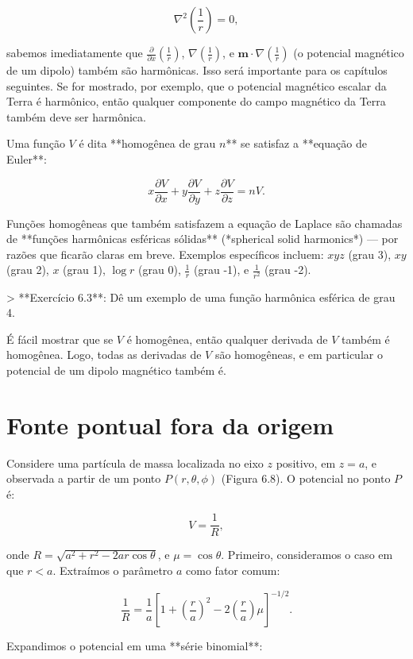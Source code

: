 $$
\nabla^2 \left( \frac{1}{r} \right) = 0,
$$

sabemos imediatamente que $\frac{\partial}{\partial x} \left( \frac{1}{r} \right)$, $\nabla \left( \frac{1}{r} \right)$, e $\mathbf{m} \cdot \nabla \left( \frac{1}{r} \right)$ (o potencial magnético de um dipolo) também são harmônicas. Isso será importante para os capítulos seguintes. Se for mostrado, por exemplo, que o potencial magnético escalar da Terra é harmônico, então qualquer componente do campo magnético da Terra também deve ser harmônica.

Uma função $V$ é dita **homogênea de grau $n$** se satisfaz a **equação de Euler**:

$$
x \frac{\partial V}{\partial x} + y \frac{\partial V}{\partial y} + z \frac{\partial V}{\partial z} = n V. \tag{6.19}
$$

Funções homogêneas que também satisfazem a equação de Laplace são chamadas de **funções harmônicas esféricas sólidas** (*spherical solid harmonics*) — por razões que ficarão claras em breve. Exemplos específicos incluem: $xyz$ (grau 3), $xy$ (grau 2), $x$ (grau 1), $\log r$ (grau 0), $\frac{1}{r}$ (grau -1), e $\frac{1}{r^2}$ (grau -2).

> **Exercício 6.3**: Dê um exemplo de uma função harmônica esférica de grau 4.

É fácil mostrar que se $V$ é homogênea, então qualquer derivada de $V$ também é homogênea. Logo, todas as derivadas de $V$ são homogêneas, e em particular o potencial de um dipolo magnético também é.





\section{Fonte pontual fora da origem}


Considere uma partícula de massa localizada no eixo $z$ positivo, em $z = a$, e observada a partir de um ponto $P(r, \theta, \phi)$ (Figura 6.8). O potencial no ponto $P$ é:

$$
V = \frac{1}{R},
$$

onde $R = \sqrt{a^2 + r^2 - 2ar\cos\theta}$, e $\mu = \cos\theta$. Primeiro, consideramos o caso em que $r < a$. Extraímos o parâmetro $a$ como fator comum:

$$
\frac{1}{R} = \frac{1}{a} \left[1 + \left(\frac{r}{a}\right)^2 - 2\left(\frac{r}{a}\right)\mu \right]^{-1/2}. \tag{6.20}
$$

Expandimos o potencial em uma **série binomial**:

